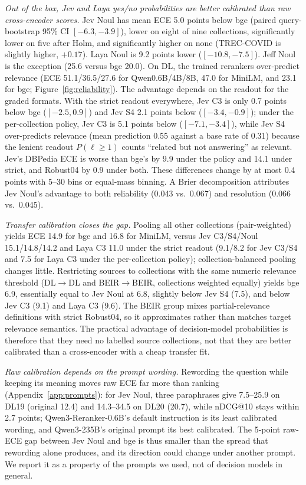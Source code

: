 \emph{Out of the box, Jev and Laya yes/no probabilities are better calibrated than raw cross-encoder scores.}
Jev Noul has mean ECE 5.0 points below bge (paired query-bootstrap 95\% CI $[-6.3,-3.9]$), lower on eight of nine collections, significantly lower on five after Holm, and significantly higher on none (TREC-COVID is slightly higher, $+0.17$). Laya Noul is 9.2 points lower ($[-10.8,-7.5]$). Jeff Noul is the exception (25.6 versus bge 20.0). On DL, the trained rerankers over-predict relevance (ECE 51.1/36.5/27.6 for Qwen0.6B/4B/8B, 47.0 for MiniLM, and 23.1 for bge; Figure~\ref{fig:reliability}).
The advantage depends on the readout for the graded formats. With the strict readout everywhere, Jev C3 is only 0.7 points below bge ($[-2.5,0.9]$) and Jev S4 2.1 points below ($[-3.4,-0.9]$); under the per-collection policy, Jev C3 is 5.1 points below ($[-7.1,-3.4]$), while Jev S4 over-predicts relevance (mean prediction 0.55 against a base rate of 0.31) because the lenient readout $P(\ell\ge1)$ counts ``related but not answering'' as relevant. Jev's DBPedia ECE is worse than bge's by 9.9 under the policy and 14.1 under strict, and Robust04 by 0.9 under both.
These differences change by at most 0.4 points with 5--30 bins or equal-mass binning. A Brier decomposition attributes Jev Noul's advantage to both reliability (0.043 vs.\ 0.067) and resolution (0.066 vs.\ 0.045).

\emph{Transfer calibration closes the gap.}
Pooling all other collections (pair-weighted) yields ECE 14.9 for bge and 16.8 for MiniLM, versus Jev C3/S4/Noul 15.1/14.8/14.2 and Laya C3 11.0 under the strict readout (9.1/8.2 for Jev C3/S4 and 7.5 for Laya C3 under the per-collection policy); collection-balanced pooling changes little. Restricting sources to collections with the same numeric relevance threshold (DL$\to$DL and BEIR$\to$BEIR, collections weighted equally) yields bge 6.9, essentially equal to Jev Noul at 6.8, slightly below Jev S4 (7.5), and below Jev C3 (9.1) and Laya C3 (9.6). The BEIR group mixes partial-relevance definitions with strict Robust04, so it approximates rather than matches target relevance semantics.
The practical advantage of decision-model probabilities is therefore that they need no labelled source collections, not that they are better calibrated than a cross-encoder with a cheap transfer fit.

\emph{Raw calibration depends on the prompt wording.} Rewording the question while keeping its meaning moves raw ECE far more than ranking (Appendix~\ref{app:prompts}): for Jev Noul, three paraphrases give 7.5--25.9 on DL19 (original 12.4) and 14.3--34.5 on DL20 (20.7), while nDCG@10 stays within 2.7 points; Qwen3-Reranker-0.6B's default instruction is its least calibrated wording, and Qwen3-235B's original prompt its best calibrated. The 5-point raw-ECE gap between Jev Noul and bge is thus smaller than the spread that rewording alone produces, and its direction could change under another prompt. We report it as a property of the prompts we used, not of decision models in general.

